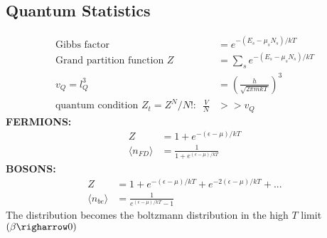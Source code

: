 \documentclass[a4paper, norsk, 8pt]{article}
\begin{document}
\begin{multicols*}{3}
\subsection*{\footnotesize  Quantum Statistics}
\begin{align*}
    \text{Gibbs factor} &= e^{-(E_s - \mu_{s} N_{s})/kT} \\
    \text{Grand partition function}\,\, Z &= \sum_s e^{-(E_s - \mu_s N_s)/kT} \\
    v_Q = l_Q^3 &= \left( \frac{h}{\sqrt{2\pi mkT}} \right)^3 \\
    \text{quantum condition $Z_t=Z^N/N!$:}\,\,\,\, \frac{V}{N} &>> v_Q
\end{align*}
\textbf{\textsc{FERMIONS:}}
\begin{align*}
    Z &= 1 + e^{-(\epsilon-\mu)/kT} \\
    \langle n_{FD} \rangle &= \frac{1}{1+e^{(\epsilon-\mu)/kT}}
\end{align*}
\textbf{\textsc{BOSONS:}}
\begin{align*}
    Z &= 1 + e^{-(\epsilon-\mu)/kT} + e^{-2(\epsilon-\mu)/kT} + ... \\
    \langle n_{be} \rangle &= \frac{1}{e^{(\epsilon-\mu)/kT}-1}
\end{align*}
The distribution becomes the boltzmann distribution in the high $T$ limit $(\beta \righarrow 0 )$

\end{multicols*}
\end{document}
